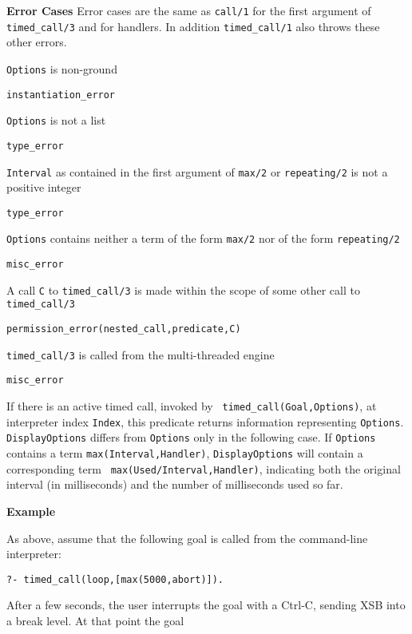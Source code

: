 \begin{description}
{\bf Error Cases} 
%
Error cases are the same as {\tt call/1} for the first argument of
{\tt timed\_call/3} and for handlers.  In addition {\tt timed\_call/1}
also throws these other errors.
%
\begin{description}
\item {\tt Options} is non-ground
\bi
\item {\tt instantiation\_error}
\ei
\item {\tt Options} is not a list
\bi
\item {\tt type\_error}
\ei
\item {\tt Interval} as contained in the first argument of {\tt max/2}
  or {\tt repeating/2} is not a positive  integer
\bi
\item {\tt type\_error}
\ei
\item {\tt Options} contains neither a term of the form {\tt max/2}
  nor of the form {\tt repeating/2}
\bi
\item {\tt misc\_error}
\ei
\item A call {\tt C} to {\tt timed\_call/3} is made within the scope
  of some other call to {\tt timed\_call/3}
%
\bi
\item {\tt permission\_error(nested\_call,predicate,{\tt C})}
\ei
\item {\tt timed\_call/3} is called from the multi-threaded engine
\bi
\item {\tt misc\_error}
\ei
\end{description}


%
If there is an active timed call, invoked by {\tt
  timed\_call(Goal,Options)}, at interpreter index {\tt Index}, this
predicate returns information representing {\tt Options}.  {\tt
  DisplayOptions} differs from {\tt Options} only in the following
case.  If {\tt Options} contains a term {\tt max(Interval,Handler)},
{\tt DisplayOptions} will contain a corresponding term {\tt
  max(Used/Interval,Handler)}, indicating both the original interval
(in milliseconds) and the number of milliseconds used so far.

{\bf Example}

As above, assume that the following goal is called from the
command-line interpreter:

{\tt ?- timed\_call(loop,[max(5000,abort)]).}

After a few seconds, the user interrupts the goal with a Ctrl-C,
sending XSB into a break level.  At that point the goal 


\end{description}
